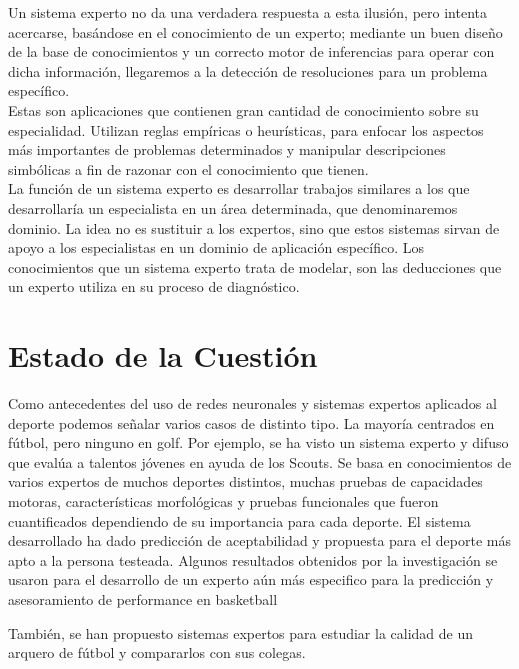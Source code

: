 \documentclass[runningheads,a4paper]{llncs}
\begin{document}
  Un sistema experto no da una verdadera respuesta a esta ilusión, pero intenta
  acercarse, basándose en el conocimiento de un experto; mediante un buen diseño
  de la base de conocimientos y un correcto motor de inferencias para operar con
  dicha información, llegaremos a la detección de resoluciones para un problema
  específico.\\ Estas son aplicaciones que contienen gran cantidad de
  conocimiento sobre su especialidad. Utilizan reglas empíricas o heurísticas,
  para enfocar los aspectos más importantes de problemas determinados y manipular
  descripciones simbólicas a fin de razonar con el conocimiento que tienen.\\ La
  función de un sistema experto es desarrollar trabajos similares a los que
  desarrollaría un especialista en un área determinada, que denominaremos
  dominio. La idea no es sustituir a los expertos, sino que estos sistemas sirvan
  de apoyo a los especialistas en un dominio de aplicación específico.  Los
  conocimientos que un sistema experto trata de modelar, son las deducciones que
  un experto utiliza en su proceso de diagnóstico.\\




\section{Estado de la Cuestión}

  Como antecedentes del uso de redes neuronales y sistemas expertos aplicados al
  deporte podemos señalar varios casos de distinto tipo. La mayoría centrados en
  fútbol, pero ninguno en golf.  Por ejemplo, se ha visto un sistema experto y
  difuso que evalúa a talentos jóvenes en ayuda de los Scouts. Se basa en
  conocimientos de varios expertos de muchos deportes distintos, muchas pruebas
  de capacidades motoras, características morfológicas y pruebas funcionales que
  fueron cuantificados dependiendo de su importancia para cada deporte.\cite{EC1}
  El sistema desarrollado ha dado predicción de aceptabilidad y propuesta para el
  deporte más apto a la persona testeada. Algunos resultados obtenidos por la
  investigación se usaron para el desarrollo de un experto aún más especifico
  para la predicción y asesoramiento de performance en basketball\cite{EC2}
  
  También, se han propuesto sistemas expertos para estudiar la calidad de un
  arquero de fútbol y compararlos con sus colegas.\cite{EC3}
  
\end{document}
